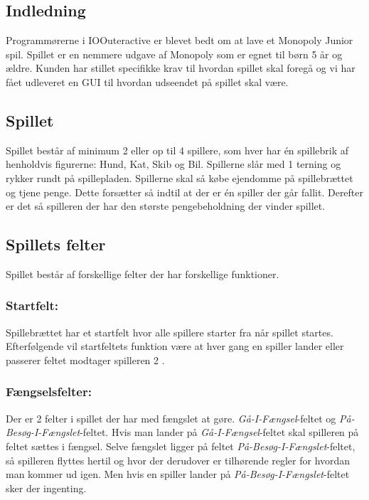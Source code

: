 \documentclass[../main.tex]{subfiles}
\begin{document}
\begin{flushleft}

\section{Indledning}
Programmørerne i IOOuteractive er blevet bedt om at lave et Monopoly Junior spil. Spillet er en nemmere udgave af Monopoly som er egnet til børn 5 år og ældre. Kunden har stillet specifikke krav til hvordan spillet skal foregå og vi har fået udleveret en GUI til hvordan udseendet på spillet skal være.\\

\subsection{Spillet}
Spillet består af minimum 2 eller op til 4 spillere, som hver har én spillebrik af henholdvis figurerne: Hund, Kat, Skib og Bil. Spillerne slår med 1 terning og rykker rundt på spillepladen. Spillerne skal så købe ejendomme på spillebrættet og tjene \M penge. Dette forsætter så indtil at der er én spiller der går fallit. Derefter er det så spilleren der har den største pengebeholdning der vinder spillet.\\

\subsection{Spillets felter}
Spillet består af forskellige felter der har forskellige funktioner.\\

\subsubsection*{Startfelt:}
Spillebrættet har et startfelt hvor alle spillere starter fra når spillet startes. Efterfølgende vil startfeltets funktion være at hver gang en spiller lander eller passerer feltet modtager spilleren 2 \M.

\subsubsection*{Fængselsfelter:}
Der er 2 felter i spillet der har med fængslet at gøre. \textit{Gå-I-Fængsel}-feltet og \textit{På-Besøg-I-Fængslet}-feltet. Hvis man lander på \textit{Gå-I-Fængsel}-feltet skal spilleren på feltet sættes i fængsel. Selve fængslet ligger på feltet \textit{På-Besøg-I-Fængslet}-feltet, så spilleren flyttes hertil og hvor der derudover er tilhørende regler for hvordan man kommer ud igen. Men hvis en spiller lander på \textit{På-Besøg-I-Fængslet}-feltet sker der ingenting.\\


\end{flushleft}
\end{document}
